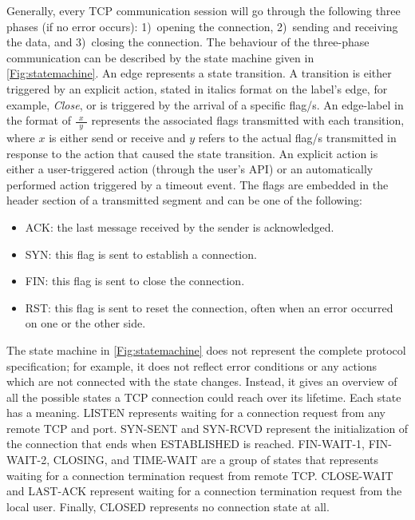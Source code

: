 \documentclass[conference]{IEEEtran}
\def\state#1{\textsf{\MakeUppercase{#1}}\xspace}
\def\sclosed{\state{closed}}
\def\ssynsent{\state{syn-sent}}
\def\ssynrcv{\state{syn-rcvd}}
\def\slisten{\state{listen}}
\def\sestab{\state{established}}
\def\sfwone{\state{fin-wait-1}}
\def\sfwtwo{\state{fin-wait-2}}
\def\sclosing{\state{closing}}
\def\sclosew{\state{close-wait}}
\def\slastack{\state{last-ack}}
\def\stimewait{\state{time-wait}}
\def\flag#1{\textsf{#1}\xspace}
\def\syn{\flag{SYN}}
\def\ack{\flag{ACK}}
\def\rst{\flag{RST}}
\def\fin{\flag{FIN}}
\begin{document}

Generally, every TCP communication session will go through the following three phases (if no error occurs): 1)~opening the connection, 2)~sending and receiving the data, and 3)~closing the connection. The behaviour of the three-phase communication can be described by the state machine given in \cref{Fig:statemachine}. An edge represents a state transition. A transition is either triggered by an explicit action, stated in italics format on the label's edge, for example, \textit{Close}, or is triggered by the arrival of a specific flag/s. An edge-label in the format of $\frac{\ \ x \ \ }{\ \ y \ \ }$ represents the associated flags transmitted with each transition, where $x$ is either send or receive and $y$ refers to the actual flag/s transmitted in response to the action that caused the state transition. An explicit action is either a user-triggered action (through the user's API) or an automatically performed action triggered by a timeout event. The flags are embedded in the header section of a transmitted segment and can be one of the following:
\begin{itemize}
\item \ack: the last message received by the sender is acknowledged.
\item \syn: this flag is sent to establish a connection.
\item \fin: this flag is sent to close the connection.
\item \rst: this flag is sent to reset the connection, often when an error
occurred on one or the other side.
\end{itemize}

The state machine in \cref{Fig:statemachine} does not represent the complete protocol specification; for example, it does not reflect error conditions or any actions which are not connected with the state changes. Instead, it gives an overview of all the possible states a TCP connection could reach over its lifetime. Each state has a meaning. \slisten represents waiting for a connection request from any remote TCP and port. \ssynsent and \ssynrcv represent the initialization of the connection that ends when \sestab is reached. \sfwone, \sfwtwo, \sclosing, and \stimewait are a group of states that represents waiting for a connection termination request from remote TCP. \sclosew and \slastack represent waiting for a connection termination request from the local user. Finally, \sclosed represents no connection state at all.
\end{document}
